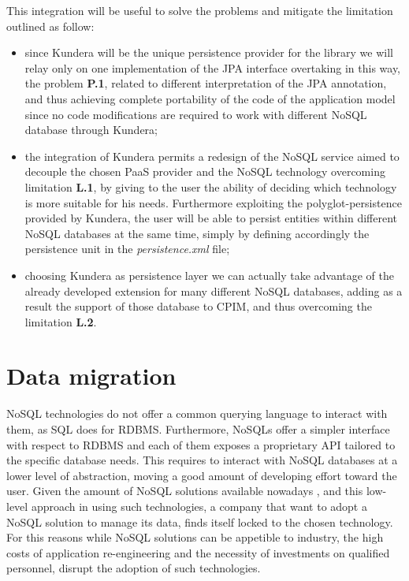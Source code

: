 \newparagraph This integration will be useful to solve the problems and mitigate the limitation outlined as follow:
\begin{itemize}
\item since Kundera will be the unique persistence provider for the library we will relay only on one implementation of the JPA interface overtaking in this way, the problem \textbf{P.1}, related to different interpretation of the JPA annotation, and thus achieving complete portability of the code of the application model since no code modifications are required to work with different NoSQL database through Kundera;
\item the integration of Kundera permits a redesign of the NoSQL service aimed to decouple the chosen PaaS provider and the NoSQL technology overcoming limitation \textbf{L.1}, by giving to the user the ability of deciding which technology is more suitable for his needs. Furthermore exploiting the polyglot-persistence provided by Kundera, the user will be able to persist entities within different NoSQL databases at the same time, simply by defining accordingly the persistence unit in the \textit{persistence.xml} file;
\item choosing Kundera as persistence layer we can actually take advantage of the already developed extension for many different NoSQL databases, adding as a result the support of those database to CPIM, and thus overcoming the limitation \textbf{L.2}.
\end{itemize}

\section{Data migration}
NoSQL technologies do not offer a common querying language to interact with them, as SQL does for RDBMS. Furthermore, NoSQLs offer a simpler interface with respect to RDBMS and each of them exposes a proprietary API tailored to the specific database needs. This requires to interact with NoSQL databases at a lower level of abstraction, moving a good amount of developing effort toward the user.
Given the amount of NoSQL solutions available nowadays \cite{online:nosql-database.org}, and this low-level approach in using such technologies, a company that want to adopt a NoSQL solution to manage its data, finds itself locked to the chosen technology. 
For this reasons while NoSQL solutions can be appetible to industry, the high costs of application re-engineering and the necessity of investments on qualified personnel, disrupt the adoption of such technologies.

